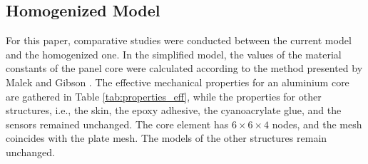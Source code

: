 \documentclass[sensors,article,accept,moreauthors,pdftex]{Definitions/mdpi}
\begin{document}
\begin{paracol}{2}
\subsection{Homogenized Model}
\label{sec:homogenization}
For this paper, comparative studies were conducted between the current model and the homogenized one. 
In the simplified model, the values of the material constants of the panel core were calculated according to the method presented by Malek and Gibson \cite{malek2015effective}.
The effective mechanical properties for an aluminium core are gathered in Table \ref{tab:properties_eff}, while the properties for other structures, i.e., the skin, the epoxy adhesive, the cyanoacrylate glue, and the sensors remained unchanged.
The core element has \(6 \times 6 \times 4\) nodes, and the mesh coincides with the plate mesh. The models of the other structures remain unchanged.

\end{paracol}
\end{document}

